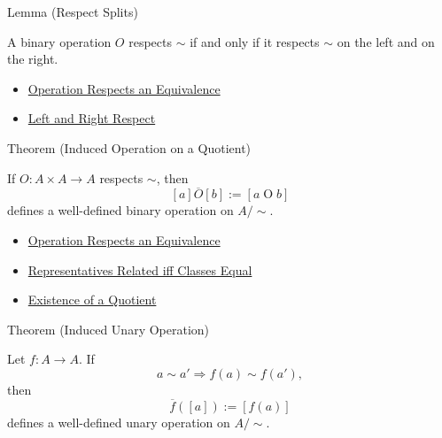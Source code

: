 \begin{lemmabox}{Lemma (Respect Splits)}
\begin{lemma}
\label{lem:respect-splits}
A binary operation $O$ respects $\sim$ if and only if it respects $\sim$ on
the left and on the right.
\end{lemma}
\end{lemmabox}

\begin{dependencies}
\begin{itemize}
  \item \hyperref[def:operation-respects-equivalence]{Operation Respects an Equivalence}
  \item \hyperref[def:left-right-respect-equivalence]{Left and Right Respect}
\end{itemize}
\end{dependencies}

\begin{theorembox}{Theorem (Induced Operation on a Quotient)}
\begin{theorem}
\label{thm:induced-operation-on-quotient}
If $O:A\times A\to A$ respects $\sim$, then
\[
[a]\mathbin{\overline{O}}[b]:=[a\mathbin{O}b]
\]
defines a well-defined binary operation on $A/{\sim}$.
\end{theorem}
\end{theorembox}

\begin{dependencies}
\begin{itemize}
  \item \hyperref[def:operation-respects-equivalence]{Operation Respects an Equivalence}
  \item \hyperref[prop:representatives-related-iff-classes-equal]{Representatives Related iff Classes Equal}
  \item \hyperref[thm:existence-of-a-quotient]{Existence of a Quotient}
\end{itemize}
\end{dependencies}

\begin{theorembox}{Theorem (Induced Unary Operation)}
\begin{theorem}
\label{thm:induced-unary-operation-on-quotient}
Let $f:A\to A$. If
\[
a\sim a'\Longrightarrow f(a)\sim f(a'),
\]
then
\[
\overline{f}([a]):=[f(a)]
\]
defines a well-defined unary operation on $A/{\sim}$.
\end{theorem}
\end{theorembox}


